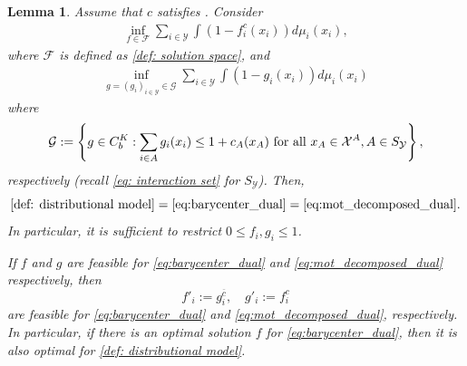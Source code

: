 \documentclass{amsart}
\theoremstyle{plain}
\numberwithin{equation}{section}\newtheorem{theorem}{Theorem}[section]
\newtheorem{lemma}[theorem]{Lemma}
\theoremstyle{remark}
\begin{document}
\begin{lemma}{\cite[Propositions 22 and 24]{jakwang_MOT}}
\label{thm:learner_part}
Assume that $c$ satisfies . Consider
\begin{equation}\label{eq:barycenter_dual}
\begin{aligned}
    \inf_{f \in \mathcal{F}} \sum_{i \in \mathcal{Y}} \int (1-f_i^c(x_i)) d\mu_i(x_i),
\end{aligned}
\end{equation}
where $\mathcal{F}$ is defined as \eqref{def: solution space}, and
\begin{equation}\label{eq:mot_decomposed_dual}
\begin{aligned}
    \inf_{g=(g_i)_{i \in \mathcal{Y}} \in \mathcal{G}} \sum_{i \in \mathcal{Y}} \int (1-g_i(x_i)) d\mu_i(x_i)    
\end{aligned}
\end{equation}
where
\begin{equation}\label{def: dual potential space}
    \mathcal{G}:= \left\{g \in C_b^K: \sum_{i\in A} g_i(x_i)\leq 1+c_A(x_A)  \textup{ for all }  x_A \in \mathcal{X}^A, A \in S_\mathcal{Y} \right\},
\end{equation}
respectively (recall \eqref{eq: interaction set} for $S_\mathcal{Y}$). Then,
\[
    \eqref{def: distributional model} = \eqref{eq:barycenter_dual} =  \eqref{eq:mot_decomposed_dual}.
\]
In particular, it is sufficient to restrict $0 \leq f_i, g_i \leq 1$.




If $f$ and $g$ are feasible for \eqref{eq:barycenter_dual} and \eqref{eq:mot_decomposed_dual} respectively, then
\[
    f'_i := g_i^{\overline{c}}, \quad g'_i := f^c_i
\]
are feasible for \eqref{eq:barycenter_dual} and \eqref{eq:mot_decomposed_dual}, respectively. In particular, if there is an optimal solution $f$ for \eqref{eq:barycenter_dual}, then it is also optimal for \eqref{def: distributional model}.


\end{lemma}
\end{document}
